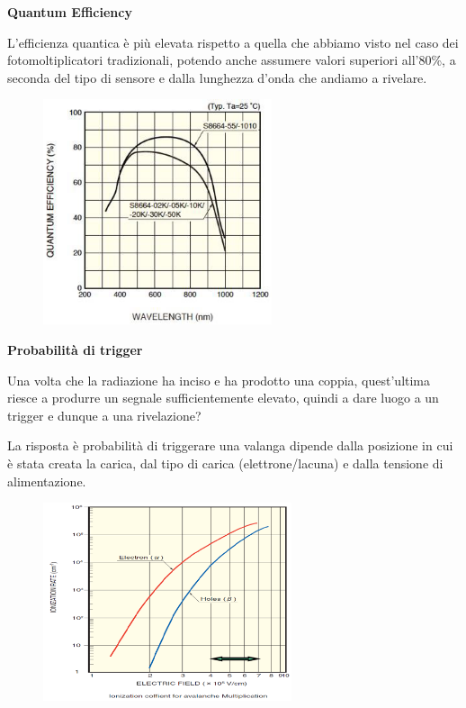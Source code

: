 \vspace{0.2cm}\textbf{Quantum Efficiency}

L'efficienza quantica è più elevata rispetto a quella che abbiamo visto nel caso dei fotomoltiplicatori tradizionali, potendo anche assumere valori superiori all'80\%, a seconda del tipo di sensore e dalla lunghezza d'onda che andiamo a rivelare.

\begin{figure}[H]
   \centering
   \includegraphics[width=0.6\textwidth]{immagini/Efficienza_quantica_SiPM.png}
\end{figure}

\textbf{Probabilità di trigger}

Una volta che la radiazione ha inciso e ha prodotto una coppia, quest'ultima riesce a produrre un segnale sufficientemente elevato, quindi a dare luogo a un trigger e dunque a una rivelazione?

La risposta è probabilità di triggerare una valanga dipende dalla posizione in cui è stata creata la carica, dal tipo di carica (elettrone/lacuna) e dalla tensione di alimentazione.

\begin{figure}[H]
   \centering
   \includegraphics[width=0.65\textwidth]{immagini/probabilita_trigger_SiPM.png}
\end{figure}

